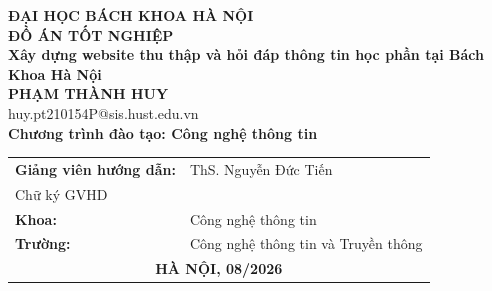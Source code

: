 \documentclass[DoAn.tex]{subfiles}
\begin{document}
\begin{titlepage}
\thispagestyle{empty}

\begin{center}

{\textbf{\large{ĐẠI HỌC BÁCH KHOA HÀ NỘI}}}\\[4cm]

{\textbf{\huge{ĐỒ ÁN TỐT NGHIỆP}}}\\[1cm]

{\textbf{\Large{Xây dựng website thu thập và hỏi đáp thông tin học phần tại Bách Khoa Hà Nội}}}\\[1cm]

{\textbf{\large{PHẠM THÀNH HUY}}}\\
{\large{huy.pt210154P@sis.hust.edu.vn}}\\[0.5cm]

{\textbf{\large{Chương trình đào tạo: Công nghệ thông tin}}}\\

\vspace{4cm}

\begin{table}[H]
\centering
\begin{tabular}{ll}

\textbf{Giảng viên hướng dẫn:}
& ThS. Nguyễn Đức Tiến
\hspace{2cm}
\raisebox{-0.05cm}{
\begin{minipage}[t]{2.5cm}
\centering
\rule{2.5cm}{0.4pt}\\[-0.1cm]
{\scriptsize Chữ ký GVHD}
\end{minipage}
}
\\[1.5cm]

\textbf{Khoa:}
& Công nghệ thông tin
\\[0.5cm]

\textbf{Trường:}
& Công nghệ thông tin và Truyền thông
\\[4.5cm]

\multicolumn{2}{c}{\textbf{HÀ NỘI, 08/2026}}

\end{tabular}
\end{table}

\end{center}

\end{titlepage}
\end{document}
